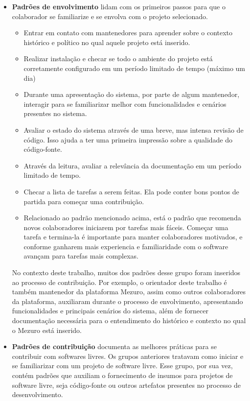 \begin{itemize}
	\item \textbf{Padrões de envolvimento} lidam com os primeiros passos para que o colaborador se familiarize e se envolva com o projeto selecionado.

		\begin{itemize}
			\item Entrar em contato com mantenedores para aprender sobre o contexto 	histórico e político no qual aquele projeto está inserido.

			\item Realizar instalação e checar se todo o ambiente do projeto está 	corretamente configurado em um período limitado de tempo (máximo um dia)

			\item Durante uma apresentação do sistema,  por parte de algum mantenedor, interagir para se familiarizar melhor com funcionalidades e cenários presentes no sistema.

			\item Avaliar o estado do sistema através de uma breve, mas intensa revisão de código. Isso ajuda a ter uma primeira impressão sobre a 					qualidade do código-fonte.

			\item Através da leitura, avaliar a relevância da documentação em um 			período limitado de tempo.

			\item Checar a lista de tarefas a serem feitas. Ela pode conter bons 			pontos de partida para começar uma contribuição.

			\item Relacionado ao padrão mencionado acima, está o padrão que recomenda novos colaboradores iniciarem por tarefas mais fáceis. Começar uma tarefa 			e termina-la é importante para manter colaboradores motivados, e conforme 			ganharem mais experiencia e familiaridade com o software avançam para 			tarefas mais complexas.
	\end{itemize}

No contexto deste trabalho, muitos dos padrões desse grupo foram inseridos ao processo de contribuição. Por exemplo, o orientador deste trabalho é também mantenedor da plataforma Mezuro, assim como outros colaboradores da plataforma, auxiliaram durante o processo de envolvimento, apresentando funcionalidades e principais cenários do sistema, além de fornecer documentação necessária para o entendimento do histórico e contexto no qual o Mezuro está inserido.
	
	\item \textbf{Padrões de contribuição} documenta as melhores práticas para 	se contribuir com softwares livres. Os grupos anteriores tratavam como iniciar 	e se familiarizar com um projeto de software livre. Esse grupo, por sua vez, 		contém padrões que auxiliam o fornecimento de insumos para projetos de software livre, seja código-fonte ou outros artefatos presentes no processo de desenvolvimento.


\end{itemize}
